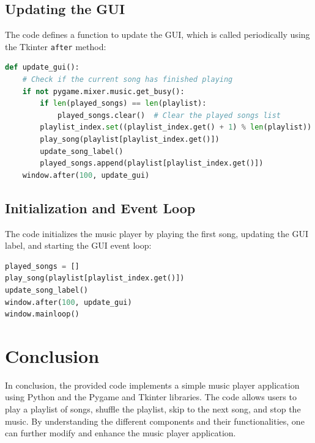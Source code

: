 \documentclass{article}
\begin{document}
\subsection{Updating the GUI}
The code defines a function to update the GUI, which is called periodically using the Tkinter \texttt{after} method:
\begin{lstlisting}[language=Python]
def update_gui():
    # Check if the current song has finished playing
    if not pygame.mixer.music.get_busy():
        if len(played_songs) == len(playlist):
            played_songs.clear()  # Clear the played songs list
        playlist_index.set((playlist_index.get() + 1) % len(playlist))
        play_song(playlist[playlist_index.get()])
        update_song_label()
        played_songs.append(playlist[playlist_index.get()])
    window.after(100, update_gui)
\end{lstlisting}

\subsection{Initialization and Event Loop}
The code initializes the music player by playing the first song, updating the GUI label, and starting the GUI event loop:
\begin{lstlisting}[language=Python]
played_songs = []
play_song(playlist[playlist_index.get()])
update_song_label()
window.after(100, update_gui)
window.mainloop()
\end{lstlisting}

\section{Conclusion}
In conclusion, the provided code implements a simple music player application using Python and the Pygame and Tkinter libraries. The code allows users to play a playlist of songs, shuffle the playlist, skip to the next song, and stop the music. By understanding the different components and their functionalities, one can further modify and enhance the music player application.
\end{document}
